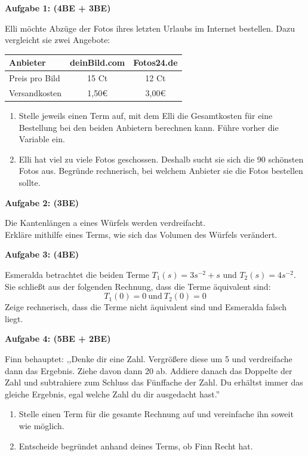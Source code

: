 \documentclass[a4paper,12pt]{article}
\newcommand{\Aufgabe}[1]{
  {
  \vspace*{0.5cm}
  \textsf{\textbf{Aufgabe #1}}
  \vspace*{0.2cm}
  
  }
}
\begin{document}
\vspace{1cm}

\Aufgabe{1: (4BE + 3BE)}
Elli möchte Abzüge der Fotos ihres letzten Urlaubs im Internet bestellen. Dazu vergleicht sie zwei Angebote:
\begin{center}
    \begin{tabular}{|l|c|c|}
        \hline
        Anbieter & deinBild.com & Fotos24.de \\
        \hline
        Preis pro Bild & 15 Ct & 12 Ct \\
        \hline
        Versandkosten & 1,50\euro & 3,00\euro \\
        \hline
    \end{tabular}
\end{center}

\begin{enumerate}[label={\alph*)}]
  \item Stelle jeweils einen Term auf, mit dem Elli die Gesamtkosten für eine Bestellung bei den beiden Anbietern berechnen kann. Führe vorher die Variable ein.
  \item Elli hat viel zu viele Fotos geschossen. Deshalb sucht sie sich die 90 schönsten Fotos aus. Begründe rechnerisch, bei welchem Anbieter sie die Fotos bestellen sollte.
\end{enumerate}

\Aufgabe{2: (3BE)}
Die Kantenlängen a eines Würfels werden verdreifacht.\\
Erkläre mithilfe eines Terms, wie sich das Volumen des Würfels verändert.


\Aufgabe{3: (4BE)}
Esmeralda betrachtet die beiden Terme $T_{1}(s) = 3s^{-2} + s$ und $T_{2}(s) = 4s^{-2}$. Sie schließt aus der folgenden Rechnung, dass die Terme äquivalent sind:
\[ T_{1}(0) = 0\  \text{und}\  T_{2}(0) = 0 \]
Zeige rechnerisch, dass die Terme nicht äquivalent sind und Esmeralda falsch liegt.

\Aufgabe{4: (5BE + 2BE)}
Finn behauptet: ,,Denke dir eine Zahl. Vergrößere diese um 5 und verdreifache dann das Ergebnis. Ziehe davon dann 20 ab. Addiere danach das Doppelte der Zahl und subtrahiere zum Schluss das Fünffache der Zahl. Du erhältst immer das gleiche Ergebnis, egal welche Zahl du dir ausgedacht hast.''

\begin{enumerate}[label={\alph*)}]
  \item Stelle einen Term für die gesamte Rechnung auf und vereinfache ihn soweit wie möglich.
  \item Entscheide begründet anhand deines Terms, ob Finn Recht hat.
\end{enumerate}
\end{document}
